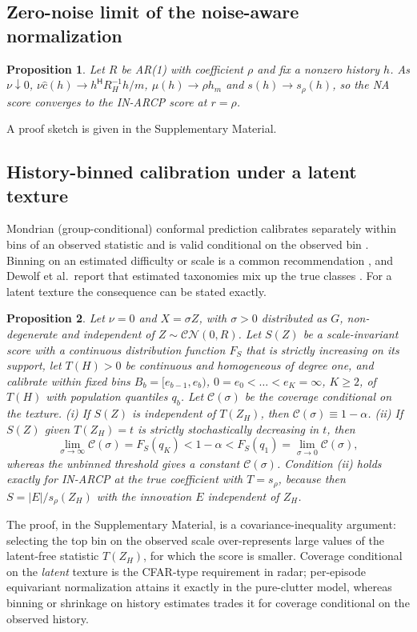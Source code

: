 \documentclass[journal]{IEEEtran}
\newtheorem{proposition}{Proposition}
\begin{document}
\subsection{Zero-noise limit of the noise-aware normalization}
\begin{proposition}\label{prop:reduce}
Let $R$ be AR(1) with coefficient $\rho$ and fix a nonzero history $h$. As $\nu\downarrow0$, $\nu\widehat c(h)\to h^{\mathsf H}R_H^{-1}h/m$, $\mu(h)\to\rho h_m$ and $s(h)\to s_\rho(h)$, so the NA score converges to the IN-ARCP score at $r=\rho$.
\end{proposition}
A proof sketch is given in the Supplementary Material.

\subsection{History-binned calibration under a latent texture}
Mondrian (group-conditional) conformal prediction calibrates separately within bins of an observed statistic and is valid conditional on the observed bin \cite{vovk2012,bostrom2020}. Binning on an estimated difficulty or scale is a common recommendation \cite{bostrom2020}, and Dewolf et al.\ report that estimated taxonomies mix up the true classes \cite[\S5.2]{dewolf2025}. For a latent texture the consequence can be stated exactly.
\begin{proposition}\label{prop:mondrian}
Let $\nu=0$ and $X=\sigma Z$, with $\sigma>0$ distributed as $G$, non-degenerate and independent of $Z\sim\mathcal{CN}(0,R)$. Let $S(Z)$ be a scale-invariant score with a continuous distribution function $F_S$ that is strictly increasing on its support, let $T(H)>0$ be continuous and homogeneous of degree one, and calibrate within fixed bins $B_b=[e_{b-1},e_b)$, $0=e_0<\dots<e_K=\infty$, $K\ge2$, of $T(H)$ with population quantiles $q_b$. Let $\mathcal C(\sigma)$ be the coverage conditional on the texture.
(i) If $S(Z)$ is independent of $T(Z_H)$, then $\mathcal C(\sigma)\equiv1-\alpha$.
(ii) If $S(Z)$ given $T(Z_H)=t$ is strictly stochastically decreasing in $t$, then
\[
\lim_{\sigma\to\infty}\mathcal C(\sigma)=F_S(q_K)<1-\alpha<F_S(q_1)=\lim_{\sigma\to0}\mathcal C(\sigma),
\]
whereas the unbinned threshold gives a constant $\mathcal C(\sigma)$.
Condition (ii) holds exactly for IN-ARCP at the true coefficient with $T=s_\rho$, because then $S=|E|/s_\rho(Z_H)$ with the innovation $E$ independent of $Z_H$.
\end{proposition}
The proof, in the Supplementary Material, is a covariance-inequality argument: selecting the top bin on the observed scale over-represents large values of the latent-free statistic $T(Z_H)$, for which the score is smaller. Coverage conditional on the \emph{latent} texture is the CFAR-type requirement in radar; per-episode equivariant normalization attains it exactly in the pure-clutter model, whereas binning or shrinkage on history estimates trades it for coverage conditional on the observed history.
\end{document}
